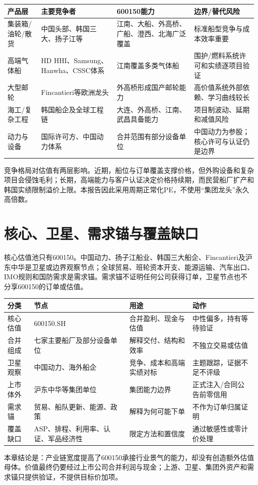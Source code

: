 \begin{exhibitbox}[产品层竞争与国产化边界]
\small
\begin{tabularx}{\exhibitboxwidth}{L{2.8cm}L{3.8cm}L{3.5cm}X}
\toprule
\textbf{产品层} & \textbf{主要竞争者} & \textbf{600150能力} & \textbf{边界/替代风险} \\
\midrule
集装箱/油轮/散货 & 中国头部、韩国三大、扬子江等 & 江南、大船、外高桥、广船、澄西、北海广泛覆盖 & 标准船型竞争与成本效率重要 \\
高端气体船 & HD HHI、Samsung、Hanwha、CSSC体系 & 江南覆盖多类气体船 & 围护/燃料系统许可和实绩逐项目验证 \\
大型邮轮 & Fincantieri等欧洲龙头 & 外高桥形成国产邮轮能力 & 高价值系统外部依赖、学习曲线较长 \\
海工/复杂工程 & 韩国船企及全球工程链 & 大连、外高桥、江南、武昌具备能力 & 项目制波动、延期和减值风险 \\
动力与设备 & 国际许可方、中国动力体系 & 合并范围有部分设备单位 & 中国动力为参股；核心许可与认证仍是边界 \\
\bottomrule
\end{tabularx}
\end{exhibitbox}

竞争格局对估值有两层影响。近期，船位与订单覆盖支撑价格，但外购设备和复杂项目会侵蚀毛利；长期，高端能力与客户认证决定价格持续期，而民营船厂扩产和韩国实绩限制溢价上限。本报告因此采用周期正常化PE，不使用“集团龙头”永久高倍数。

\section{核心、卫星、需求锚与覆盖缺口}

核心估值池只有600150。中国动力、扬子江船业、韩国三大船企、Fincantieri及沪东中华是卫星或边界观察节点；全球贸易、班轮资本开支、能源运输、汽车出口、IMO规则和国防需求是需求锚。需求锚不证明任何公司获得订单，卫星节点也不分享600150的订单或估值。

\begin{exhibitbox}[全链条投资分类]
\small
\begin{tabularx}{\exhibitboxwidth}{L{2.8cm}L{4.2cm}L{3.5cm}X}
\toprule
\textbf{分类} & \textbf{节点} & \textbf{用途} & \textbf{动作} \\
\midrule
核心估值 & 600150.SH & 合并盈利、现金与估值 & 中性偏多，持有等待验证 \\
合并组成 & 七家主要船厂及部分设备单位 & 解释交付、结构和效率 & 不独立交易或估值 \\
卫星观察 & 中国动力、海外船企 & 竞争、成本和高端实绩对标 & 主题跟踪，证据不足不评级 \\
上市体外 & 沪东中华等集团单位 & 集团能力边界 & 正式注入/合同公告前零信用 \\
需求锚 & 贸易、船队更新、能源、政策 & 解释为何可能下单 & 不作为订单归属证明 \\
覆盖缺口 & ASP、排程、利用率、认证、军品经济性 & 限定方法和置信度 & 通过敏感性或零计价处理 \\
\bottomrule
\end{tabularx}
\end{exhibitbox}

本章结论是：产业链宽度提高了600150承接行业景气的能力，却没有创造额外估值母体。价值最终仍要经过上市公司合并利润与现金；上游、卫星、集团外资产和需求锚只提供验证，不提供目标价加项。
